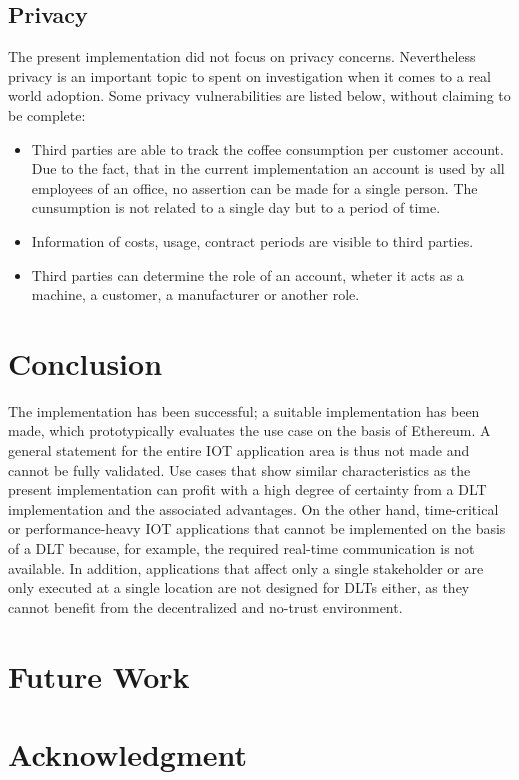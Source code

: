 \documentclass[conference]{IEEEtran}
\begin{document}
\subsection{Privacy}
The present implementation did not focus on privacy concerns. Nevertheless privacy is an important topic to spent on investigation when it comes to a real world adoption. Some privacy vulnerabilities are listed below, without claiming to be complete:\\
\begin{itemize}
  \item Third parties are able to track the coffee consumption per customer account. Due to the fact, that in the current implementation an account is used by all employees of an office, no assertion can be made for a single person. The cunsumption is not related to a single day but to a period of time.
  \item Information of costs, usage, contract periods are visible to third parties.
  \item Third parties can determine the role of an account, wheter it acts as a machine, a customer, a manufacturer or another role.
\end{itemize}


\section{Conclusion}
The implementation has been successful; a suitable implementation has been made, which prototypically evaluates the use case on the basis of Ethereum. A general statement for the entire IOT application area is thus not made and cannot be fully validated.  Use cases that show similar characteristics as the present implementation can profit with a high degree of certainty from a DLT implementation and the associated advantages. On the other hand, time-critical or performance-heavy IOT applications that cannot be implemented on the basis of a DLT because, for example, the required real-time communication is not available. In addition, applications that affect only a single stakeholder or are only executed at a single location are not designed for DLTs either, as they cannot benefit from the decentralized and no-trust environment.

\section{Future Work}
\textit{\lipsum[1-1]}

\section*{Acknowledgment}
\textit{\lipsum[1-1]}





\end{document}
